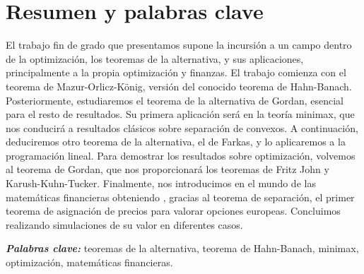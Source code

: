 \chapter{Resumen y palabras clave}

El trabajo fin de grado que presentamos supone la incursión a un campo dentro de la optimización, los teoremas de la alternativa, y sus aplicaciones, principalmente a la propia optimización y finanzas. El trabajo comienza con el teorema de Mazur-Orlicz-König, versión del conocido teorema de Hahn-Banach. Posteriormente, estudiaremos el teorema de la alternativa de Gordan, esencial para el resto de resultados. Su primera aplicación será en la teoría minimax, que nos conducirá a resultados clásicos sobre separación de convexos. A continuación, deduciremos otro teorema de la alternativa, el de Farkas, y lo aplicaremos a la programación lineal. Para demostrar los resultados sobre optimización, volvemos al teorema de Gordan, que nos proporcionará los teoremas de Fritz John y Karush-Kuhn-Tucker. Finalmente, nos introducimos en el mundo de las matemáticas financieras obteniendo , gracias al teorema de separación, el primer teorema de asignación de precios para valorar opciones europeas. Concluimos realizando simulaciones de su valor en diferentes casos.\\

\providecommand{\pclave}[1]
{
	\small	
	\textbf{\textit{Palabras clave: }} #1
}
\pclave{teoremas de la alternativa, teorema de Hahn-Banach, minimax, optimización, matemáticas financieras.}